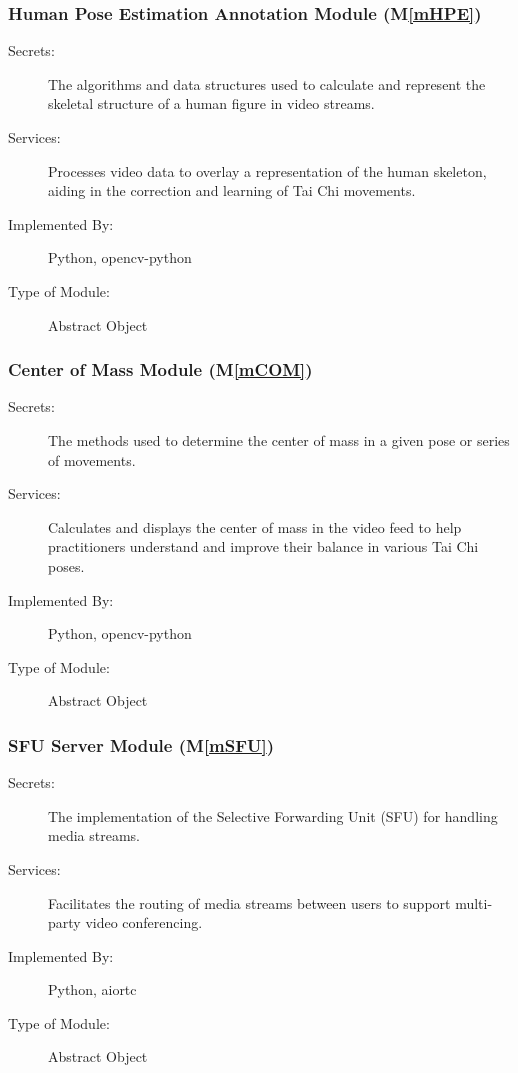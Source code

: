\documentclass[12pt, titlepage]{article}
\newcommand{\mref}[1]{M\ref{#1}}
\begin{document}
\subsubsection{Human Pose Estimation Annotation Module (\mref{mHPE})}

\begin{description}
\item[Secrets:] The algorithms and data structures used to calculate and represent the skeletal structure of a human figure in video streams.
\item[Services:] Processes video data to overlay a representation of the human skeleton, aiding in the correction and learning of Tai Chi movements.
\item[Implemented By:] Python, opencv-python
\item[Type of Module:] Abstract Object
\end{description}

\subsubsection{Center of Mass Module (\mref{mCOM})}

\begin{description}
\item[Secrets:] The methods used to determine the center of mass in a given pose or series of movements.
\item[Services:] Calculates and displays the center of mass in the video feed to help practitioners understand and improve their balance in various Tai Chi poses.
\item[Implemented By:] Python, opencv-python
\item[Type of Module:] Abstract Object
\end{description}

\subsubsection{SFU Server Module (\mref{mSFU})}

\begin{description}
\item[Secrets:] The implementation of the Selective Forwarding Unit (SFU) for handling media streams.
\item[Services:] Facilitates the routing of media streams between users to support multi-party video conferencing.
\item[Implemented By:] Python, aiortc
\item[Type of Module:] Abstract Object
\end{description}
\end{document}

